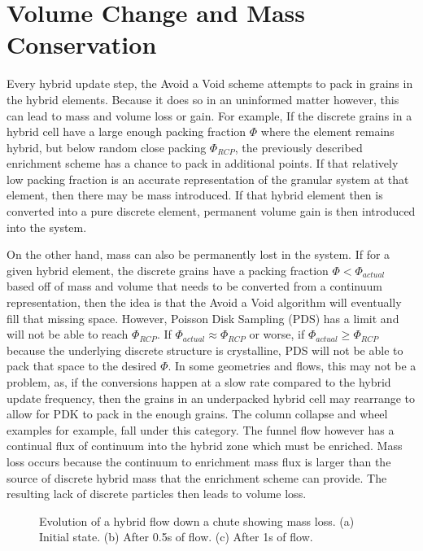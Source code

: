 \section{Volume Change and Mass Conservation}
Every hybrid update step, the Avoid a Void scheme attempts to pack in grains in the hybrid elements. Because it does so in an uninformed matter however, this can lead to mass and volume loss or gain. For example, If the discrete grains in a hybrid cell have a large enough packing fraction $\Phi$ where the element remains hybrid, but below random close packing $\Phi_{RCP}$, the previously described enrichment scheme has a chance to pack in additional points. If that relatively low packing fraction is an accurate representation of the granular system at that element, then there may be mass introduced. If that hybrid element then is converted into a pure discrete element, permanent volume gain is then introduced into the system. 

On the other hand, mass can also be permanently lost in the system. If for a given hybrid element, the discrete grains have a packing fraction $\Phi < \Phi_{actual}$ based off of mass and volume that needs to be converted from a continuum representation, then the idea is that the Avoid a Void algorithm will eventually fill that missing space. However, Poisson Disk Sampling (PDS) has a limit and will not be able to reach $\Phi_{RCP}$. If $\Phi_{actual} \approx \Phi_{RCP}$ or worse, if $\Phi_{actual} \geq \Phi_{RCP}$ because the underlying discrete structure is crystalline, PDS will not be able to pack that space to the desired $\Phi$. In some geometries and flows, this may not be a problem, as, if the conversions happen at a slow rate compared to the hybrid update frequency, then the grains in an underpacked hybrid cell may rearrange to allow for PDK to pack in the enough grains. The column collapse and wheel examples for example, fall under this category. The funnel flow however has a continual flux of continuum into the hybrid zone which must be enriched. Mass loss occurs because the continuum to enrichment mass flux is larger than the source of discrete hybrid mass that the enrichment scheme can provide. The resulting lack of discrete particles then leads to volume loss.

\begin{figure}[htp] 
    \centering
    \caption{Evolution of a hybrid flow down a chute showing mass loss. (a) Initial state. (b) After 0.5s of flow. (c) After 1s of flow.}%
    \label{chute_flow_old}
\end{figure}

